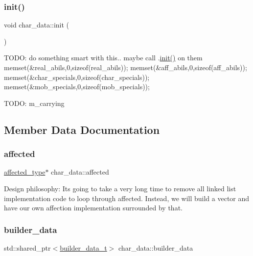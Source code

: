 \subsubsection{\texorpdfstring{init()}{init()}}
{\footnotesize\ttfamily void char\+\_\+data\+::init (\begin{DoxyParamCaption}{ }\end{DoxyParamCaption})}

T\+O\+DO\+: do something smart with this.. maybe call .\hyperlink{structchar__data_ac08c59f455b01ef91858398b98c708fc}{init()} on them memset(\&real\+\_\+abils,0,sizeof(real\+\_\+abils)); memset(\&aff\+\_\+abils,0,sizeof(aff\+\_\+abils)); memset(\&char\+\_\+specials,0,sizeof(char\+\_\+specials)); memset(\&mob\+\_\+specials,0,sizeof(mob\+\_\+specials));

T\+O\+DO\+: m\+\_\+carrying 

\subsection{Member Data Documentation}
\mbox{\label{structchar__data_ab61e858143366048e8a6538b287f4f4f}} 
\subsubsection{\texorpdfstring{affected}{affected}}
{\footnotesize\ttfamily \hyperlink{structaffected__type}{affected\+\_\+type}$\ast$ char\+\_\+data\+::affected}

Design philosophy\+: It\textquotesingle{}s going to take a very long time to remove all linked list implementation code to loop through affected. Instead, we will build a vector and have our own affection implementation surrounded by that. \mbox{\label{structchar__data_a560ec5d4891a5086b00063eb995bdf3e}} 
\subsubsection{\texorpdfstring{builder\+\_\+data}{builder\_data}}
{\footnotesize\ttfamily std\+::shared\+\_\+ptr$<$\hyperlink{structbuilder__data__t}{builder\+\_\+data\+\_\+t}$>$ char\+\_\+data\+::builder\+\_\+data}

